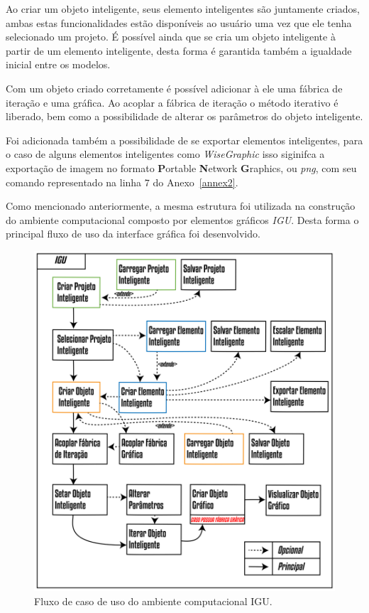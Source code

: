 Ao criar um objeto inteligente, seus elemento inteligentes são juntamente criados, ambas estas funcionalidades estão disponíveis ao usuário uma vez que ele tenha selecionado um projeto. É possível ainda que se cria um objeto inteligente à partir de um elemento inteligente, desta forma é garantida também a igualdade inicial entre os modelos.

Com um objeto criado corretamente é possível adicionar à ele uma fábrica de iteração e uma gráfica. Ao acoplar a fábrica de iteração o método iterativo é liberado, bem como a possibilidade de alterar os parâmetros do objeto inteligente.

Foi adicionada também a possibilidade de se exportar elementos inteligentes, para o caso de alguns elementos inteligentes como \textit{WiseGraphic} isso siginifca a exportação de imagem no formato \textbf{P}ortable \textbf{N}etwork \textbf{G}raphics, ou \textit{png}, com seu comando representado na linha $7$ do Anexo~\ref{annex2}.

Como mencionado anteriormente, a mesma estrutura foi utilizada na construção do ambiente computacional composto por elementos gráficos \textit{IGU}. Desta forma o principal fluxo de uso da interface gráfica foi desenvolvido.

\begin{figure}[!htbp]
	\centering
	\includegraphics[width=\linewidth]{Figures/CasoDeUso2@16x.png}
	\caption{Fluxo de caso de uso do ambiente computacional IGU.}
	\label{fig:caso_uso2}
\end{figure}

